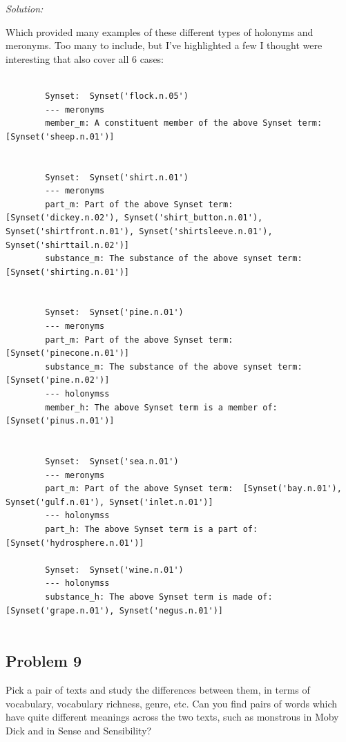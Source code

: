 \documentclass[11pt]{article}
\newenvironment{solution}{
	\vspace{10px}\noindent\emph{Solution:}
}{
	\vspace{10px}
}
\begin{document}
\begin{solution}
	Which provided many examples of these different types of holonyms and meronyms. Too many to include, but I've highlighted a few I thought were interesting that also cover all 6 cases:
	
	\begin{lstlisting}
		
		Synset:  Synset('flock.n.05')
		--- meronyms
		member_m: A constituent member of the above Synset term:  [Synset('sheep.n.01')]
		
		
		Synset:  Synset('shirt.n.01')
		--- meronyms
		part_m: Part of the above Synset term:  [Synset('dickey.n.02'), Synset('shirt_button.n.01'), Synset('shirtfront.n.01'), Synset('shirtsleeve.n.01'), Synset('shirttail.n.02')]
		substance_m: The substance of the above synset term:  [Synset('shirting.n.01')]
		
		
		Synset:  Synset('pine.n.01')
		--- meronyms
		part_m: Part of the above Synset term:  [Synset('pinecone.n.01')]
		substance_m: The substance of the above synset term:  [Synset('pine.n.02')]
		--- holonymss
		member_h: The above Synset term is a member of:  [Synset('pinus.n.01')]
		
		
		Synset:  Synset('sea.n.01')
		--- meronyms
		part_m: Part of the above Synset term:  [Synset('bay.n.01'), Synset('gulf.n.01'), Synset('inlet.n.01')]
		--- holonymss
		part_h: The above Synset term is a part of:  [Synset('hydrosphere.n.01')]
		
		Synset:  Synset('wine.n.01')
		--- holonymss
		substance_h: The above Synset term is made of:  [Synset('grape.n.01'), Synset('negus.n.01')]
		
	\end{lstlisting}
	
\end{solution}  


\subsection*{Problem 9}
Pick a pair of texts and study the differences between them, in terms of vocabulary, vocabulary richness, genre, etc. Can you find pairs of words which have quite different meanings across the two texts, such as monstrous in Moby Dick and in Sense and Sensibility?
\end{document}

